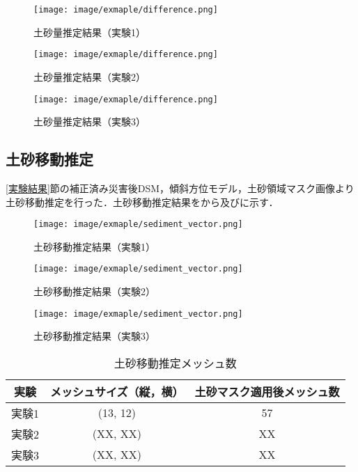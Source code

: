       \begin{figure}[t]
        \centering
        \texttt{[image: image/exmaple/difference.png]}
        \caption{土砂量推定結果（実験1）}
        \label{土砂量推定結果（実験1）}
      \end{figure}

      \begin{figure}[t]
        \centering
        \texttt{[image: image/exmaple/difference.png]}
        \caption{土砂量推定結果（実験2）}
      \end{figure}

      \begin{figure}[t]
        \centering
        \texttt{[image: image/exmaple/difference.png]}
        \caption{土砂量推定結果（実験3）}
        \label{土砂量推定結果（実験3）}
      \end{figure}


    \subsection*{土砂移動推定}
      \ref{実験結果}節の補正済み災害後DSM，傾斜方位モデル，土砂領域マスク画像より土砂移動推定を行った．土砂移動推定結果をから及びに示す．

      \begin{figure}[t]
        \centering
        \texttt{[image: image/exmaple/sediment\_vector.png]}
        \caption{土砂移動推定結果（実験1）}
        \label{土砂移動推定結果（実験1）}
      \end{figure}

      \begin{figure}[t]
        \centering
        \texttt{[image: image/exmaple/sediment\_vector.png]}
        \caption{土砂移動推定結果（実験2）}
      \end{figure}

      \begin{figure}[t]
        \centering
        \texttt{[image: image/exmaple/sediment\_vector.png]}
        \caption{土砂移動推定結果（実験3）}
        \label{土砂移動推定結果（実験3）}
      \end{figure}

      \begin{table}[b]
        \centering
        \caption{土砂移動推定メッシュ数}
        \label{土砂移動推定メッシュ数}
        \begin{tabular}{ccc}
          \hline
          \textbf{実験} & \textbf{メッシュサイズ（縦，横）} & \textbf{土砂マスク適用後メッシュ数} \\
          \hline  \hline
          実験1 & (13, 12) & 57 \\
          実験2 & (XX, XX) & XX \\
          実験3 & (XX, XX) & XX \\ \hline
        \end{tabular}
      \end{table}


